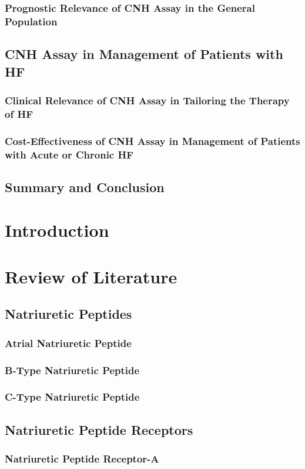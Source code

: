 {{{{{{{{{\subsubsection{ Prognostic Relevance of CNH Assay in the General Population}
\subsection{ CNH Assay in Management of Patients with HF}
\subsubsection{ Clinical Relevance of CNH Assay in Tailoring the Therapy of HF}
\subsubsection{ Cost-Effectiveness of CNH Assay in Management of Patients with Acute or Chronic HF}
\subsection{ Summary and Conclusion}
\section{Introduction}
\section{Review of Literature}
\subsection{Natriuretic Peptides}
\subsubsection{Atrial Natriuretic Peptide}
\subsubsection{B-Type Natriuretic Peptide}
\subsubsection{C-Type Natriuretic Peptide}
\subsection{Natriuretic Peptide Receptors}
\subsubsection{Natriuretic Peptide Receptor-A}
}}}}}}}}}
